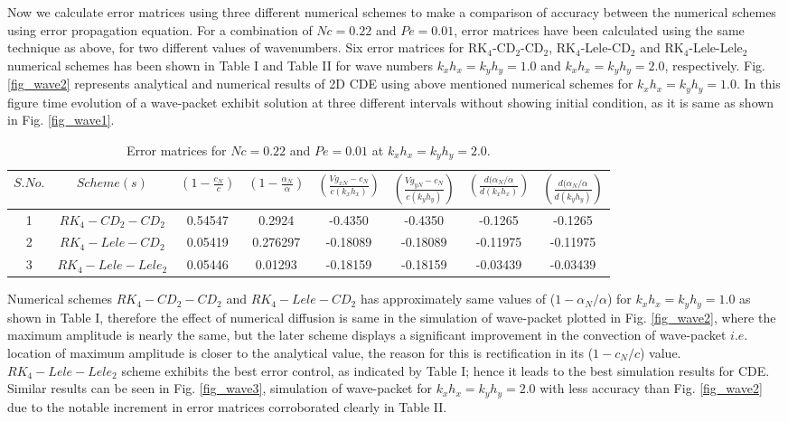 \documentclass[showpacs,preprintnumbers,amsmath,amssymb]{revtex4-1} %
\begin{document}
Now we calculate error matrices using three different numerical schemes to make a comparison of accuracy between the numerical schemes using error propagation equation. For a combination of $Nc=0.22$ and $Pe=0.01$, error matrices have been calculated using the same technique as above, for two different values of wavenumbers. Six error matrices for RK$_4$-CD$_2$-CD$_2$, RK$_4$-Lele-CD$_2$ and RK$_4$-Lele-Lele$_2$ numerical schemes has been shown in Table I and Table II for wave numbers $k_xh_x=k_yh_y=1.0$ and $k_xh_x=k_yh_y=2.0$, respectively. Fig. \ref{fig_wave2} represents analytical and numerical results of 2D CDE using above mentioned numerical schemes for $k_xh_x=k_yh_y=1.0$. In this figure time evolution of a wave-packet exhibit solution at three different intervals without showing initial condition, as it is same as shown in Fig. \ref{fig_wave1}.

\begin{table}[h!]
  \begin{center}
    \caption{Error matrices for $Nc=0.22$ and $Pe=0.01$ at $k_xh_x=k_yh_y=2.0$.}
    \label{tab:table2}
    \begin{tabular}{|c|c|c|c|c|c|c|c|} %
      \hline
      $S. No.$ & $Scheme(s)$ & $\left(1-\frac{c_N}{c}\right)$ & $\left(1-\frac{\alpha_N}{\alpha}\right)$ & $\left(\frac{Vg_{xN}-c_N}{c(k_xh_x)}\right)$ & $\left(\frac{Vg_{yN}-c_N}{c(k_yh_y)}\right)$ & $\left(\frac{d(\alpha_N/\alpha}{d(k_xh_x)}\right)$ & $\left(\frac{d(\alpha_N/\alpha}{d(k_yh_y)}\right)$ \\
      \hline
      1 & $RK_4-CD_2-CD_2$ & 0.54547 & 0.2924 & -0.4350 & -0.4350 & -0.1265 & -0.1265\\
      2 & $RK_4-Lele-CD_2$ & 0.05419 & 0.276297 & -0.18089 & -0.18089 & -0.11975 & -0.11975\\
      3 & $RK_4-Lele-Lele_2$ & 0.05446 & 0.01293 & -0.18159 & -0.18159 & -0.03439 & -0.03439\\
      \hline
    \end{tabular}
  \end{center}
\end{table}

Numerical schemes $RK_4-CD_2-CD_2$ and $RK_4-Lele-CD_2$ has approximately same values of ($1-\alpha_N/\alpha$) for $k_xh_x=k_yh_y=1.0$ as shown in Table I, therefore the effect of numerical diffusion is same in the simulation of wave-packet plotted in Fig. \ref{fig_wave2}, where the maximum amplitude is nearly the same, but the later scheme displays a significant improvement in the convection of wave-packet $\textit{i.e.}$ location of maximum amplitude is closer to the analytical value, the reason for this is rectification in its ($1-c_N/c$) value. $RK_4-Lele-Lele_2$ scheme exhibits the best error control, as indicated by Table I; hence it leads to the best simulation results for CDE. Similar results can be seen in Fig. \ref{fig_wave3}, simulation of wave-packet for $k_xh_x=k_yh_y=2.0$ with less accuracy than Fig. \ref{fig_wave2} due to the notable increment in error matrices corroborated clearly in Table II.
\end{document}
